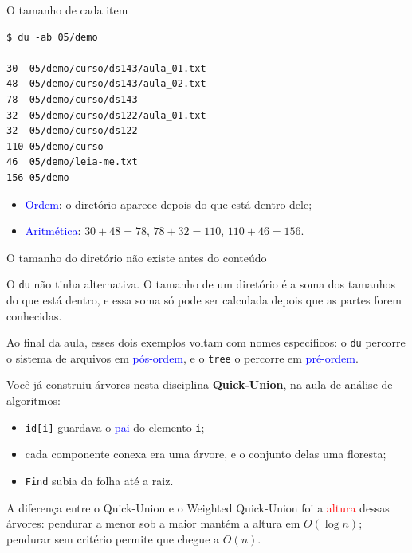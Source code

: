 \documentclass{beamer}
\newcommand{\tcb}[1]{\textcolor{blue}{#1}}
\newcommand{\tcr}[1]{\textcolor{red}{#1}}
\begin{document}
\begin{frame}[fragile]{O tamanho de cada item}
  \begin{verbatim}
$ du -ab 05/demo

30	05/demo/curso/ds143/aula_01.txt
48	05/demo/curso/ds143/aula_02.txt
78	05/demo/curso/ds143
32	05/demo/curso/ds122/aula_01.txt
32	05/demo/curso/ds122
110	05/demo/curso
46	05/demo/leia-me.txt
156	05/demo
  \end{verbatim}

  \begin{itemize}
    \item \tcb{Ordem}: o diretório aparece depois do que está dentro dele;
    \item \tcb{Aritmética}: $30 + 48 = 78$, $78 + 32 = 110$, $110 + 46 = 156$.
  \end{itemize}
\end{frame}

\begin{frame}{O tamanho do diretório não existe antes do conteúdo}
  \begin{block}{}
    O \texttt{du} não tinha alternativa. O tamanho de um diretório é a soma dos
    tamanhos do que está dentro, e essa soma só pode ser calculada depois que as
    partes forem conhecidas.
  \end{block}

  \vspace{0.6cm}
  Ao final da aula, esses dois exemplos voltam com nomes específicos: o \texttt{du}
  percorre o sistema de arquivos em \tcb{pós-ordem}, e o \texttt{tree} o
  percorre em \tcb{pré-ordem}.
\end{frame}

\begin{frame}{Você já construiu árvores nesta disciplina}
  \textbf{Quick-Union}, na aula de análise de algoritmos:

  \begin{itemize}
    \item \texttt{id[i]} guardava o \tcb{pai} do elemento \texttt{i};
    \item cada componente conexa era uma árvore, e o conjunto delas uma
          floresta;
    \item \texttt{Find} subia da folha até a raiz.
  \end{itemize}

  \vspace{0.4cm}
  A diferença entre o Quick-Union e o Weighted Quick-Union foi a \tcr{altura}
  dessas árvores: pendurar a menor sob a maior mantém a altura em
  $O(\log n)$; pendurar sem critério permite que chegue a $O(n)$.
\end{frame}
\end{document}
